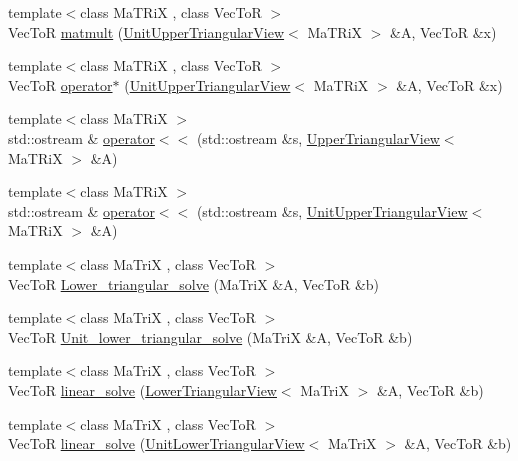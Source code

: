 \begin{DoxyCompactItemize}
\item 
{\footnotesize template$<$class MaTRiX , class VecToR $>$ }\\VecToR \hyperlink{namespace_t_n_t_a414ff38d855d929783510c785cdd81c3}{matmult} (\hyperlink{class_t_n_t_1_1_unit_upper_triangular_view}{UnitUpperTriangularView}$<$ MaTRiX $>$ \&A, VecToR \&x)
\item 
{\footnotesize template$<$class MaTRiX , class VecToR $>$ }\\VecToR \hyperlink{namespace_t_n_t_abb6b4ef7e675d6418dbde44755f1b37a}{operator$\ast$} (\hyperlink{class_t_n_t_1_1_unit_upper_triangular_view}{UnitUpperTriangularView}$<$ MaTRiX $>$ \&A, VecToR \&x)
\item 
{\footnotesize template$<$class MaTRiX $>$ }\\std::ostream \& \hyperlink{namespace_t_n_t_a1f5a57d566c65a3e1eba0376bf5b71c0}{operator$<$$<$} (std::ostream \&s, \hyperlink{class_t_n_t_1_1_upper_triangular_view}{UpperTriangularView}$<$ MaTRiX $>$ \&A)
\item 
{\footnotesize template$<$class MaTRiX $>$ }\\std::ostream \& \hyperlink{namespace_t_n_t_abe6b55eb518bd67eb84d782e53fe9def}{operator$<$$<$} (std::ostream \&s, \hyperlink{class_t_n_t_1_1_unit_upper_triangular_view}{UnitUpperTriangularView}$<$ MaTRiX $>$ \&A)
\item 
{\footnotesize template$<$class MaTriX , class VecToR $>$ }\\VecToR \hyperlink{namespace_t_n_t_a93cf98206fa641a7189ae4aa03fa7c5e}{Lower\_\-triangular\_\-solve} (MaTriX \&A, VecToR \&b)
\item 
{\footnotesize template$<$class MaTriX , class VecToR $>$ }\\VecToR \hyperlink{namespace_t_n_t_a17e216ba2b0960d02573466e564f54e7}{Unit\_\-lower\_\-triangular\_\-solve} (MaTriX \&A, VecToR \&b)
\item 
{\footnotesize template$<$class MaTriX , class VecToR $>$ }\\VecToR \hyperlink{namespace_t_n_t_a20a470aed088e9c73fcc7a273cec9425}{linear\_\-solve} (\hyperlink{class_t_n_t_1_1_lower_triangular_view}{LowerTriangularView}$<$ MaTriX $>$ \&A, VecToR \&b)
\item 
{\footnotesize template$<$class MaTriX , class VecToR $>$ }\\VecToR \hyperlink{namespace_t_n_t_a745c446330527defb7f4fedc086b0c65}{linear\_\-solve} (\hyperlink{class_t_n_t_1_1_unit_lower_triangular_view}{UnitLowerTriangularView}$<$ MaTriX $>$ \&A, VecToR \&b)
\item 

\end{DoxyCompactItemize}
